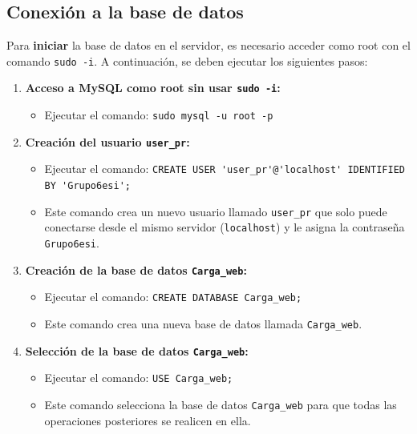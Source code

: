 \documentclass[10pt]{book}
\begin{document}
\subsection{Conexión a la base de datos}

    Para \textbf{iniciar} la base de datos en el servidor, es necesario acceder como root con el comando \lstinline{sudo -i}. A continuación, se deben ejecutar los siguientes pasos:
    
    \begin{enumerate}
        \item \textbf{Acceso a MySQL como root sin usar \texttt{sudo -i}:}
        \begin{itemize}
            \item Ejecutar el comando: \lstinline{sudo mysql -u root -p}
        \end{itemize}
    
        \item \textbf{Creación del usuario \texttt{user\_pr}:}
        \begin{itemize}
            \item Ejecutar el comando: \lstinline{CREATE USER 'user_pr'@'localhost' IDENTIFIED BY 'Grupo6esi';}
            \item Este comando crea un nuevo usuario llamado \texttt{user\_pr} que solo puede conectarse desde el mismo servidor (\texttt{localhost}) y le asigna la contraseña \texttt{Grupo6esi}.
        \end{itemize}
    
        \item \textbf{Creación de la base de datos \texttt{Carga\_web}:}
        \begin{itemize}
            \item Ejecutar el comando: \lstinline{CREATE DATABASE Carga_web;}
            \item Este comando crea una nueva base de datos llamada \texttt{Carga\_web}.
        \end{itemize}
    
        \item \textbf{Selección de la base de datos \texttt{Carga\_web}:}
        \begin{itemize}
            \item Ejecutar el comando: \lstinline{USE Carga_web;}
            \item Este comando selecciona la base de datos \texttt{Carga\_web} para que todas las operaciones posteriores se realicen en ella.
        \end{itemize}
    

\end{enumerate}
\end{document}
